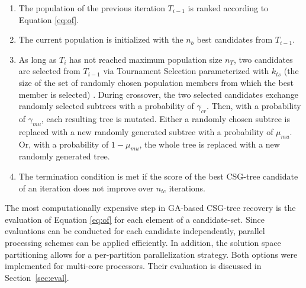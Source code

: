 \begin{enumerate}
\item The population of the previous iteration $T_{i-1}$ is ranked according to Equation \ref{eq:of}.
\item The current population is initialized with the $n_b$ best candidates from $T_{i-1}$.
\item As long as $T_i$ has not reached maximum population size $n_T$, two candidates are selected from $T_{i-1}$ via Tournament Selection parameterized with $k_{ts}$ (the size of the set of randomly chosen population members from which the best member is selected) \cite{miller95genetic}.
During crossover, the two selected candidates exchange randomly selected subtrees with a probability of $\gamma_{cr}$.
Then, with a probability of $\gamma_{mu}$, each resulting tree is mutated. 
Either a randomly chosen subtree is replaced with a new randomly generated subtree with a probability of $\mu_{mu}$. Or, with a probability of $1-\mu_{mu}$, the whole tree is replaced with a new randomly generated tree.
\item The termination condition is met if the score of the best \ac{CSG}-tree candidate of an iteration does not improve over $n_{tc}$ iterations.  	 
\end{enumerate}  
The most computationally expensive step in \ac{GA}-based \ac{CSG}-tree recovery is the evaluation of Equation \ref{eq:of} for each element of a candidate-set. 
Since evaluations can be conducted for each candidate independently, parallel processing schemes can be applied efficiently.  
In addition, the solution space partitioning allows for a per-partition parallelization strategy.
Both options were implemented for multi-core processors. Their evaluation is discussed in Section~\ref{sec:eval}.
